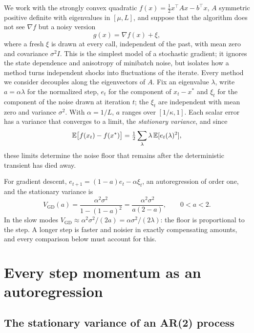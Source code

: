 We work with the strongly convex quadratic
$f(x)=\tfrac12x^\top Ax-b^\top x$, $A$ symmetric positive definite with
eigenvalues in $[\mu,L]$, and suppose that the algorithm does not see
$\nabla f$ but a noisy version
\begin{equation}\label{eq:ch7:oracle}
  g(x)=\nabla f(x)+\xi,
\end{equation}
where a fresh $\xi$ is drawn at every call, independent of the past, with mean
zero and covariance $\sigma^2I$. This is the simplest model of a stochastic
gradient; it ignores the state dependence and anisotropy of minibatch noise,
but isolates how a method turns independent shocks into fluctuations of the
iterate. Every method we consider decouples along the eigenvectors of $A$. Fix
an eigenvalue $\lambda$, write $a=\alpha\lambda$ for the normalized step,
$e_t$ for the component of $x_t-x^\ast$ and $\xi_t$ for the component of the
noise drawn at iteration $t$; the $\xi_t$ are independent with mean zero and
variance $\sigma^2$. With $\alpha=1/L$, $a$ ranges over $[1/\kappa,1]$. Each
scalar error has a variance that converges to a limit, the \emph{stationary
variance}, and since
\begin{equation}\label{eq:ch7:gap}
  \mathbb{E}\bigl[f(x_t)-f(x^\ast)\bigr]=\tfrac12\sum_{\lambda}\lambda\,\mathbb{E}[e_t(\lambda)^2],
\end{equation}
these limits determine the noise floor that remains after the
deterministic transient has died away.

For gradient descent, $e_{t+1}=(1-a)e_t-\alpha\xi_t$, an autoregression of
order one, and the stationary variance is
\begin{equation}\label{eq:ch7:gd}
  V_{\mathrm{GD}}(a)=\frac{\alpha^2\sigma^2}{1-(1-a)^2}
  =\frac{\alpha^2\sigma^2}{a(2-a)},\qquad 0<a<2.
\end{equation}
In the slow modes $V_{\mathrm{GD}}\approx\alpha^2\sigma^2/(2a)=\alpha\sigma^2/(2\lambda)$:
the floor is proportional to the step. A longer step is faster and noisier in
exactly compensating amounts, and every comparison below must account for
this.

\section{Every step momentum as an autoregression}\label{sec:ch7:ar2}

\subsection{The stationary variance of an AR(2) process}

